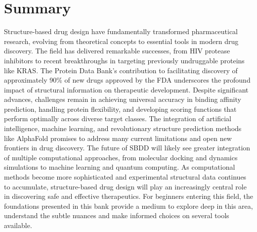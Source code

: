 \documentclass[12pt, a4paper]{article}
\begin{document}
\section{Summary}
Structure-based drug design have fundamentally transformed pharmaceutical research, evolving from theoretical concepts to essential tools in modern drug discovery. The field has delivered remarkable successes, from HIV protease inhibitors to recent breakthroughs in targeting previously undruggable proteins like KRAS. The Protein Data Bank’s contribution to facilitating discovery of approximately 90\% of new drugs approved by the FDA underscores the profound impact of structural information on therapeutic development. Despite significant advances, challenges remain in achieving universal accuracy in binding affinity prediction, handling protein flexibility, and developing scoring functions that perform optimally across diverse target classes. The integration of artificial intelligence, machine learning, and revolutionary structure prediction methods like AlphaFold promises to address many current limitations and open new frontiers in drug discovery. The future of SBDD will likely see greater integration of multiple computational approaches, from molecular docking and dynamics simulations to machine learning and quantum computing. As computational methods become more sophisticated and experimental structural data continues to accumulate, structure-based drug design will play an increasingly central role in discovering safe and effective therapeutics. For beginners entering this field, the foundations presented in this bank provide a medium to explore deep in this area, understand the subtle nuances and make informed choices on several tools available. 



\end{document}
